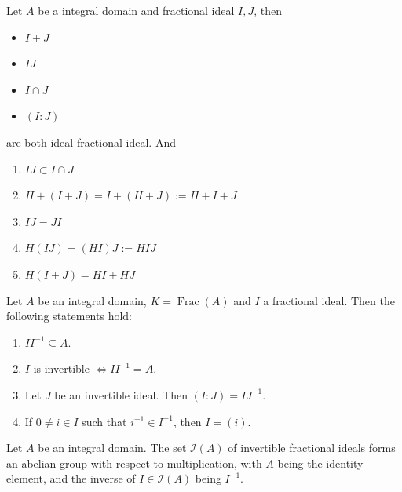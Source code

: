 \documentclass[12pt, oneside]{book}
\begin{document}
\begin{lemma}
    Let $A$ be a integral domain and fractional ideal $I,J$, then
    \begin{itemize}
        \item $I+J$
        \item $IJ$
        \item $I\cap J$
        \item $\left(I:J\right)$
    \end{itemize}
    are both ideal fractional ideal. And
    \begin{enumerate}
        \item $IJ\subset I\cap J$
        \item $H+(I+J)=I+(H+J):=H+I+J$
        \item $IJ=JI$
        \item $H(IJ)=(HI)J:=HIJ$
        \item $H(I+J)=HI+HJ$
    \end{enumerate}
\end{lemma}


\begin{proposition}
    Let $A$ be an integral domain, $K=\operatorname{Frac}(A)$ and $I$ a fractional ideal. Then the following statements hold:
    \begin{enumerate}
        \item
              $I I^{-1} \subseteq A$.
        \item
              $I$ is invertible $\Leftrightarrow I I^{-1}=A$.
        \item
              Let $J$ be an invertible ideal. Then $(I: J)=I J^{-1}$.
        \item  If $0 \neq i \in I$ such that $i^{-1} \in I^{-1}$, then $I=(i)$.
    \end{enumerate}
\end{proposition}
\begin{corollary}
    Let $A$ be an integral domain. The set $\mathcal{I}(A)$ of invertible fractional ideals forms an abelian group with respect to multiplication, with $A$ being the identity element, and the inverse of $I \in \mathcal{I}(A)$ being $I^{-1}$.
\end{corollary}
\end{document}
